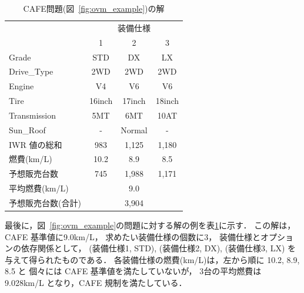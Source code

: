 \begin{table}[t]
  \centering
  \caption{CAFE問題(図~\ref{fig:ovm_example})の解}
  \begin{tabular}{l|c|c|c} \bhline
    \multicolumn{1}{c|}{装備}   & \multicolumn{3}{c}{装備仕様} \\ \cline{2-4}
                          & 1	& 2 	 & 3	\\  \hline
    \textsf{Grade}        & \textsf{STD}    & \textsf{DX}     & \textsf{LX}\\
    \textsf{Drive\_Type}  & \textsf{2WD}    & \textsf{2WD}    & \textsf{2WD}\\
    \textsf{Engine}	  & \textsf{V4}     & \textsf{V6}     & \textsf{V6}\\
    \textsf{Tire}	  & \textsf{16inch} & \textsf{17inch} & \textsf{18inch}\\
    \textsf{Transmission} & \textsf{5MT}    & \textsf{6MT}    & \textsf{10AT}\\
    \textsf{Sun\_Roof}    & -               & \textsf{Normal} & -  \\ \hline
    IWR 値の総和          & 983  & 1,125   & 1,180 \\ %
    燃費(km/L)      & 10.2  & 8.9     & 8.5 \\ %
    予想販売台数    & 745   & 1,988   & 1,171  \\ \hline
    平均燃費(km/L)  & \multicolumn{3}{c}{9.0} \\ 
    予想販売台数(合計)  & \multicolumn{3}{c}{3,904} \\ \hline
 \end{tabular}
 \label{tab:ovm_ans}
\end{table}

最後に，図~\ref{fig:ovm_example}の問題に対する解の例を表\ref{tab:ovm_ans}に示す．
この解は，
CAFE 基準値に9.0km/L，
求めたい装備仕様の個数に3，
装備仕様とオプションの依存関係として，
(装備仕様1, \textsf{STD}),
(装備仕様2, \textsf{DX}),
(装備仕様3, \textsf{LX})
を与えて得られたものである．
各装備仕様の燃費(km/L)は，左から順に 10.2, 8.9, 8.5 と
個々には CAFE 基準値を満たしていないが，
3台の平均燃費は 9.028km/L となり，CAFE 規制を満たしている．


